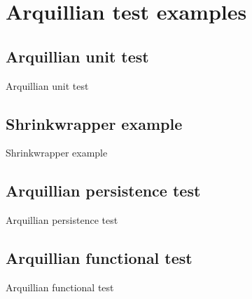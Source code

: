 \section[Examples]{Arquillian test examples}

\subsection[Unit test]{Arquillian unit test}
\begin{frame}{Arquillian unit test}

\end{frame}

\subsection[Shrinkwrapper]{Shrinkwrapper example}
\begin{frame}{Shrinkwrapper example}

\end{frame}
\subsection[Persistence test]{Arquillian persistence test}
\begin{frame}{Arquillian persistence test}
\end{frame}
\subsection[Functional test]{Arquillian functional test}
\begin{frame}{Arquillian functional test}
\end{frame}

